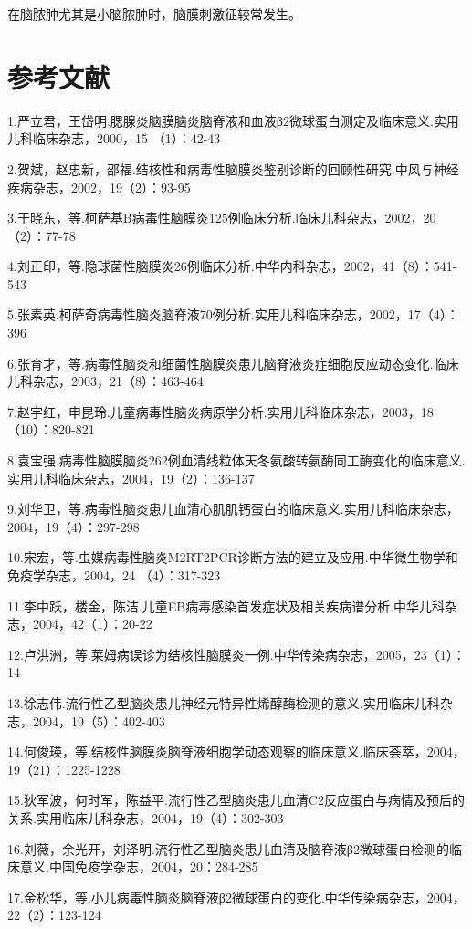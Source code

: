 在脑脓肿尤其是小脑脓肿时，脑膜刺激征较常发生。

\protect\hypertarget{text00393.html}{}{}

\section{参考文献}

1.严立君，王岱明.腮腺炎脑膜脑炎脑脊液和血液β2微球蛋白测定及临床意义.实用儿科临床杂志，2000，15
（1）：42-43

2.贺斌，赵忠新，邵福.结核性和病毒性脑膜炎鉴别诊断的回顾性研究.中风与神经疾病杂志，2002，19（2）：93-95

3.于晓东，等.柯萨基B病毒性脑膜炎125例临床分析.临床儿科杂志，2002，20（2）：77-78

4.刘正印，等.隐球菌性脑膜炎26例临床分析.中华内科杂志，2002，41（8）：541-543

5.张素英.柯萨奇病毒性脑炎脑脊液70例分析.实用儿科临床杂志，2002，17（4）：396

6.张育才，等.病毒性脑炎和细菌性脑膜炎患儿脑脊液炎症细胞反应动态变化.临床儿科杂志，2003，21（8）：463-464

7.赵宇红，申昆玲.儿童病毒性脑炎病原学分析.实用儿科临床杂志，2003，18（10）：820-821

8.袁宝强.病毒性脑膜脑炎262例血清线粒体天冬氨酸转氨酶同工酶变化的临床意义.实用儿科临床杂志，2004，19（2）：136-137

9.刘华卫，等.病毒性脑炎患儿血清心肌肌钙蛋白的临床意义.实用儿科临床杂志，2004，19（4）：297-298

10.宋宏，等.虫媒病毒性脑炎M2RT2PCR诊断方法的建立及应用.中华微生物学和免疫学杂志，2004，24
（4）：317-323

11.李中跃，楼金，陈洁.儿童EB病毒感染首发症状及相关疾病谱分析.中华儿科杂志，2004，42（1）：20-22

12.卢洪洲，等.莱姆病误诊为结核性脑膜炎一例.中华传染病杂志，2005，23（1）：14

13.徐志伟.流行性乙型脑炎患儿神经元特异性烯醇酶检测的意义.实用临床儿科杂志，2004，19（5）：402-403

14.何俊瑛，等.结核性脑膜炎脑脊液细胞学动态观察的临床意义.临床荟萃，2004，19（21）：1225-1228

15.狄军波，何时军，陈益平.流行性乙型脑炎患儿血清C2反应蛋白与病情及预后的关系.实用临床儿科杂志，2004，19（4）：302-303

16.刘薇，余光开，刘泽明.流行性乙型脑炎患儿血清及脑脊液β2微球蛋白检测的临床意义.中国免疫学杂志，2004，20：284-285

17.金松华，等.小儿病毒性脑炎脑脊液β2微球蛋白的变化.中华传染病杂志，2004，22（2）：123-124

